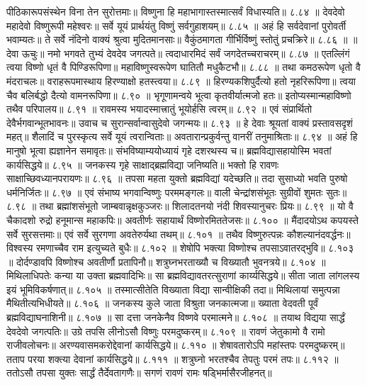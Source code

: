 पीठिकारूपसंस्थेन विना तेन सुरोत्तमाः॥
विष्णुना हि महाभागास्तस्मात्सर्वं विधास्यति॥ ८.८४ ॥
देवदेवो महादेवो विष्णुरूपी महेश्वरः॥
सर्वे यूयं प्रार्थयंतु विष्णुं सर्वगुहाशयम्॥ ८.८५ ॥
अहं हि सर्वदेवानां पुरोवर्ती भवाम्यतः॥
ते सर्वे नंदिनो वाक्यं श्रुत्वा मुदितमानसाः॥
वैकुंठमागता गीर्भिर्विष्णुं स्तोतुं प्रचक्रिरे॥ ८.८६ ॥
॥ देवा ऊचुः॥
नमो भगवते तुभ्यं देवदेव जगत्पते॥
त्वदाधारमिदं सर्वं जगदेतच्चराचरम्॥ ८.८७ ॥
एतल्लिंगं त्वया विष्णो धृतं वै पिण्डिरूपिणा॥
महाविष्णुस्वरूपेण घातितौ मधुकैटभौ॥ ८.८८ ॥
तथा कमठरूपेण धृतो वै मंदराचलः॥
वराहरूपमास्थाय हिरण्याक्षो हतस्त्वया॥ ८.८९ ॥
हिरण्यकशिपुर्दैत्यो हतो नृहरिरूपिणा॥
त्वया चैव बलिर्बद्धो दैत्यो वामनरूपिणा॥ ८.९० ॥
भृगूणामन्वये भूत्वा कृतवीर्यात्मजो हतः॥
इतोप्यस्मान्महाविष्णो तथैव परिपालय॥ ८.९१ ॥
रावमस्य भयादस्मात्त्रातुं भूयोर्हसि त्वरम्॥ ८.९२ ॥
एवं संप्रार्थितो देवैर्भगवान्भूतभावनः॥
उवाच च सुरान्सर्वान्वासुदेवो जगन्मयः॥ ८.९३ ॥
हे देवाः श्रूयतां वाक्यं प्रस्तावसदृशं महत्॥
शैलादिं च पुरस्कृत्य सर्वे यूयं त्वरान्विताः॥
अवतारान्प्रकुर्वन्तु वानरीं तनुमाश्रिताः॥ ८.९४ ॥
अहं हि मानुषो भूत्वा ह्यज्ञानेन समावृतः॥
संभविष्याम्ययोध्यायं गृहे दशरथस्य च॥
ब्रह्मविद्यासहायोस्मि भवतां कार्यसिद्धये॥ ८.९५ ॥
जनकस्य गृहे साक्षाद्ब्रह्मविद्या जनिष्यति॥
भक्तो हि रावणः साक्षाच्छिवध्यानपरायणः॥ ८.९६ ॥
तपसा महता युक्तो ब्रह्मविद्यां यदेच्छति॥
तदा सुसाध्यो भवति पुरुषो धर्मनिर्जितः॥ ८.९७ ॥
एवं संभाष्य भगवान्विष्णुः परममङ्गलः॥
वाली चेन्द्रांशसंभूतः सुग्रीवों शुमतः सुतः॥ ८.९८ ॥
तथा ब्रह्मांशसंभूतो जाम्बवान्नृक्षकुञ्जरः॥
शिलादतनयो नंदी शिवस्यानुचरः प्रियः॥ ८.९९ ॥
यो वै चैकादशो रुद्रो हनूमान्स महाकपिः॥
अवतीर्णः सहायार्थं विष्णोरमिततेजसः॥ ८.१०० ॥
मैंदादयोऽथ कपयस्ते सर्वे सुरसत्तमाः॥
एवं सर्वे सुरगणा अवतेरुर्यथा तथम्॥ ८.१०१ ॥
तथैव विष्णुरुत्पन्नः कौशल्यानंदवर्द्धनः॥
विश्वस्य रमणाच्चैव राम इत्युच्यते बुधैः॥ ८.१०२ ॥
शेषोपि भक्त्या विष्णोश्च तपसाऽवातरद्भुवि॥ ८.१०३ ॥
दोर्दण्डावपि विष्णोश्च अवतीर्णौ प्रतापिनौ॥
शत्रुघ्नभरताख्यौ च विख्यातौ भुवनत्रये॥ ८.१०४ ॥
मिथिलाधिपतेः कन्या या उक्ता ब्रह्मवादिभिः॥
सा ब्रह्मविद्यावतरत्सुराणां कार्य्यसिद्धये॥
सीता जाता लांगलस्य इयं भूमिविकर्षणात्॥ ८.१०५ ॥
तस्मात्सीतेति विख्याता विद्या सान्वीक्षिकी तदा॥
मिथिलायां समुत्पन्ना मैथितीत्यभिधीयते॥ ८.१०६ ॥
जनकस्य कुले जाता विश्रुता जनकात्मजा॥
ख्याता वेदवती पूर्वं ब्रह्मविद्याघनाशिनी॥ ८.१०७ ॥
सा दत्ता जनकेनैव विष्णवे परमात्मने॥ ८.१०८ ॥
तयाथ विद्यया सार्द्धं देवदेवो जगत्पतिः॥
उग्रे तपसि लीनोऽसौ विष्णुः परमदुष्करम्॥ ८.१०९ ॥
रावणं जेतुकामो वै रामो राजीवलोचनः॥
अरण्यवासमकरोद्देवानां कार्यसिद्धये॥ ८.११० ॥
शेषावतारोऽपि महांस्तपः परमदुष्करम्॥
तताप परया शक्त्या देवानां कार्यसिद्धये॥ ८.१११ ॥
शत्रुघ्नो भरतश्चैव तेपतुः परमं तपः॥ ८.११२ ॥
ततोऽसौ तपसा युक्तः सार्द्धं तैर्देवतागणैः॥
सगणं रावणं रामः षड्भिर्मासैरजीहनत्॥
